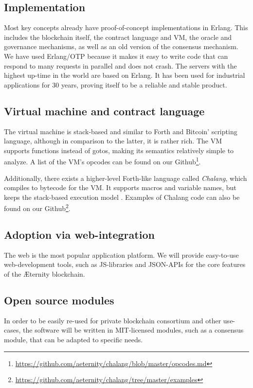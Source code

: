 \documentclass[a4paper, 10pt, conference]{ieeeconf}      %
\begin{document}
\begin{draft}
\section{Implementation}
\label{sec:implementation}
Most key concepts already have proof-of-concept implementations in Erlang. This includes the blockchain itself, the contract language and VM, the oracle and governance mechanisms, as well as an old version of the consensus mechanism. We have used Erlang/OTP because it makes it easy to write code that can respond to many requests in parallel and does not crash. The servers with the highest up-time in the world are based on Erlang. It has been used for industrial applications for 30 years, proving itself to be a reliable and stable product.

\subsection{Virtual machine and contract language}
\label{sec:chalang}
The virtual machine is stack-based and similar to Forth and Bitcoin' scripting language, although in comparison to the latter, it is rather rich. The VM supports functions instead of gotos, making its semantics relatively simple to analyze. A list of the VM's opcodes can be found on our Github\footnote{\url{https://github.com/aeternity/chalang/blob/master/opcodes.md}}.

Additionally, there exists a higher-level Forth-like language called \textit{Chalang}, which compiles to bytecode for the VM. It supports macros and variable names, but keeps the stack-based execution model \cite{chalang}. Examples of Chalang code can also be found on our Github\footnote{\url{https://github.com/aeternity/chalang/tree/master/examples}}.

\subsection{Adoption via web-integration}
The web is the most popular application platform. We will provide easy-to-use web-development tools, such as JS-libraries and JSON-APIs for the core features of the Æternity blockchain. 

\subsection{Open source modules}
In order to be easily re-used for private blockchain consortium and other use-cases, the software will be written in MIT-licensed modules, such as a consensus module, that can be adapted to specific needs. 



\end{draft}
\end{document}
